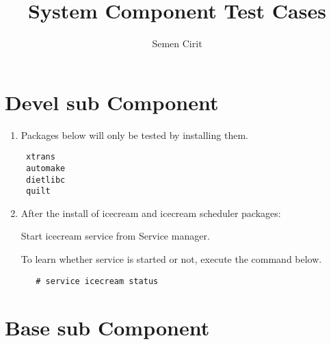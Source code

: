\documentclass[a4paper,10pt]{article}
\title{System Component Test Cases}
\author{Semen Cirit}
\begin{document}
\maketitle


\section{Devel sub Component}
\begin{enumerate}
 \item Packages below will only be tested by installing them.
\begin{verbatim}
 xtrans
 automake
 dietlibc 
 quilt
\end{verbatim}
 \item After the install of icecream and icecream scheduler packages:

Start icecream service from Service manager.

To learn whether service is started or not, execute the command below.
 \begin{verbatim}
   # service icecream status
 \end{verbatim}

\end{enumerate}


\section{Base sub Component}
\end{document}
